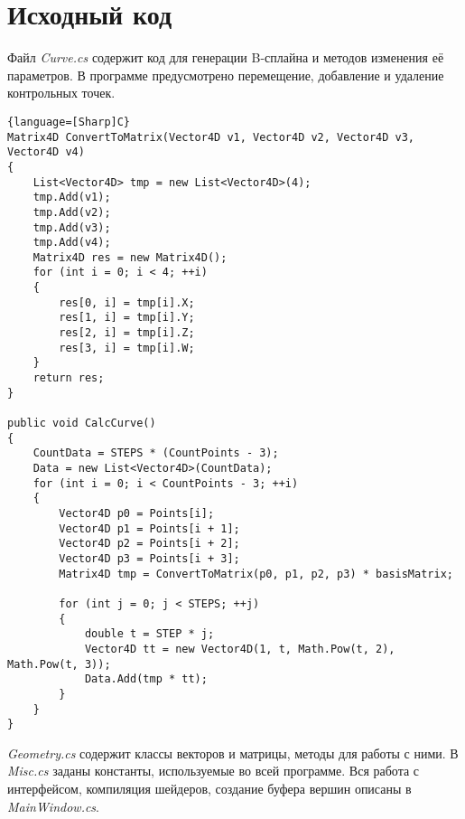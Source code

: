 \section{Исходный код}

Файл \textit{Curve.cs} содержит код для генерации B-сплайна и методов изменения её параметров. В программе предусмотрено перемещение, добавление и удаление контрольных точек.

\begin{lstlisting}{language=[Sharp]C}
Matrix4D ConvertToMatrix(Vector4D v1, Vector4D v2, Vector4D v3, Vector4D v4)
{
    List<Vector4D> tmp = new List<Vector4D>(4);
    tmp.Add(v1);
    tmp.Add(v2);
    tmp.Add(v3);
    tmp.Add(v4);
    Matrix4D res = new Matrix4D();
    for (int i = 0; i < 4; ++i)
    {
        res[0, i] = tmp[i].X;
        res[1, i] = tmp[i].Y;
        res[2, i] = tmp[i].Z;
        res[3, i] = tmp[i].W;
    }
    return res;
}

public void CalcCurve()
{
    CountData = STEPS * (CountPoints - 3);
    Data = new List<Vector4D>(CountData);
    for (int i = 0; i < CountPoints - 3; ++i)
    {
        Vector4D p0 = Points[i];
        Vector4D p1 = Points[i + 1];
        Vector4D p2 = Points[i + 2];
        Vector4D p3 = Points[i + 3];
        Matrix4D tmp = ConvertToMatrix(p0, p1, p2, p3) * basisMatrix;

        for (int j = 0; j < STEPS; ++j)
        {
            double t = STEP * j;
            Vector4D tt = new Vector4D(1, t, Math.Pow(t, 2), Math.Pow(t, 3));
            Data.Add(tmp * tt);
        }
    }
}
\end{lstlisting}

\textit{Geometry.cs} содержит классы векторов и матрицы, методы для работы с ними.
В \textit{Misc.cs} заданы константы, используемые во всей программе.
Вся работа с интерфейсом, компиляция шейдеров, создание буфера вершин описаны в \textit{MainWindow.cs}.

\pagebreak
